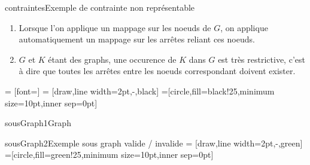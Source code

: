 \documentclass[a4paper, 12pt]{article}
\begin{document}
\begin{figu}{contraintes}{Exemple de contrainte non représentable}
\begin{enumerate}
\item Lorsque l'on applique un mappage sur les noeuds de \(G\), on applique automatiquement un mappage sur les arrêtes reliant ces noeuds.

\item \(G\) et \(K\) étant des graphs, une occurence de \(K\) dans \(G\) est très restrictive, c'est à dire que toutes les arrêtes entre les noeuds correspondant doivent exister.
\end{enumerate}

 = [font=\small]
 = [draw,line width=2pt,-,black]
=[circle,fill=black!25,minimum size=10pt,inner sep=0pt]
\begin{myfig}{sousGraph1}{Graph}
\end{myfig}


\begin{myfig}{sousGraph2}{Exemple sous graph valide / invalide}
 = [draw,line width=2pt,-,green]
=[circle,fill=green!25,minimum size=10pt,inner sep=0pt]
\end{myfig}


\end{figu}
\end{document}
